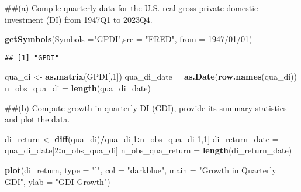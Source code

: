 \documentclass[
]{article}
\newenvironment{Shaded}{\begin{snugshade}}{\end{snugshade}}
\newcommand{\AttributeTok}[1]{\textcolor[rgb]{0.13,0.29,0.53}{#1}}
\newcommand{\DecValTok}[1]{\textcolor[rgb]{0.00,0.00,0.81}{#1}}
\newcommand{\FunctionTok}[1]{\textcolor[rgb]{0.13,0.29,0.53}{\textbf{#1}}}
\newcommand{\NormalTok}[1]{#1}
\newcommand{\OtherTok}[1]{\textcolor[rgb]{0.56,0.35,0.01}{#1}}
\newcommand{\SpecialCharTok}[1]{\textcolor[rgb]{0.81,0.36,0.00}{\textbf{#1}}}
\newcommand{\StringTok}[1]{\textcolor[rgb]{0.31,0.60,0.02}{#1}}
\begin{document}
\#\#(a) Compile quarterly data for the U.S. real gross private domestic
investment (DI) from 1947Q1 to 2023Q4.

\begin{Shaded}
\begin{Highlighting}[]
\FunctionTok{getSymbols}\NormalTok{(}\AttributeTok{Symbols =}\StringTok{"GPDI"}\NormalTok{,}\AttributeTok{src =} \StringTok{"FRED"}\NormalTok{, }\AttributeTok{from =} \StringTok{\textquotesingle{}1947/01/01\textquotesingle{}}\NormalTok{)}
\end{Highlighting}
\end{Shaded}

\begin{verbatim}
## [1] "GPDI"
\end{verbatim}

\begin{Shaded}
\begin{Highlighting}[]
\NormalTok{qua\_di }\OtherTok{\textless{}{-}} \FunctionTok{as.matrix}\NormalTok{(GPDI[,}\DecValTok{1}\NormalTok{])}
\NormalTok{qua\_di\_date }\OtherTok{=} \FunctionTok{as.Date}\NormalTok{(}\FunctionTok{row.names}\NormalTok{(qua\_di))}
\NormalTok{n\_obs\_qua\_di }\OtherTok{=} \FunctionTok{length}\NormalTok{(qua\_di\_date)}
\end{Highlighting}
\end{Shaded}

\#\#(b) Compute growth in quarterly DI (GDI), provide its summary
statistics and plot the data.

\begin{Shaded}
\begin{Highlighting}[]
\NormalTok{di\_return }\OtherTok{\textless{}{-}} \FunctionTok{diff}\NormalTok{(qua\_di)}\SpecialCharTok{/}\NormalTok{qua\_di[}\DecValTok{1}\SpecialCharTok{:}\NormalTok{n\_obs\_qua\_di}\DecValTok{{-}1}\NormalTok{,}\DecValTok{1}\NormalTok{]}
\NormalTok{di\_return\_date }\OtherTok{=}\NormalTok{ qua\_di\_date[}\DecValTok{2}\SpecialCharTok{:}\NormalTok{n\_obs\_qua\_di]}
\NormalTok{n\_obs\_qua\_return }\OtherTok{=} \FunctionTok{length}\NormalTok{(di\_return\_date)}

\FunctionTok{plot}\NormalTok{(di\_return, }\AttributeTok{type =} \StringTok{"l"}\NormalTok{, }\AttributeTok{col =} \StringTok{"darkblue"}\NormalTok{, }\AttributeTok{main =} \StringTok{"Growth in Quarterly GDI"}\NormalTok{, }\AttributeTok{ylab =} \StringTok{"GDI Growth"}\NormalTok{)}
\end{Highlighting}
\end{Shaded}
\end{document}
